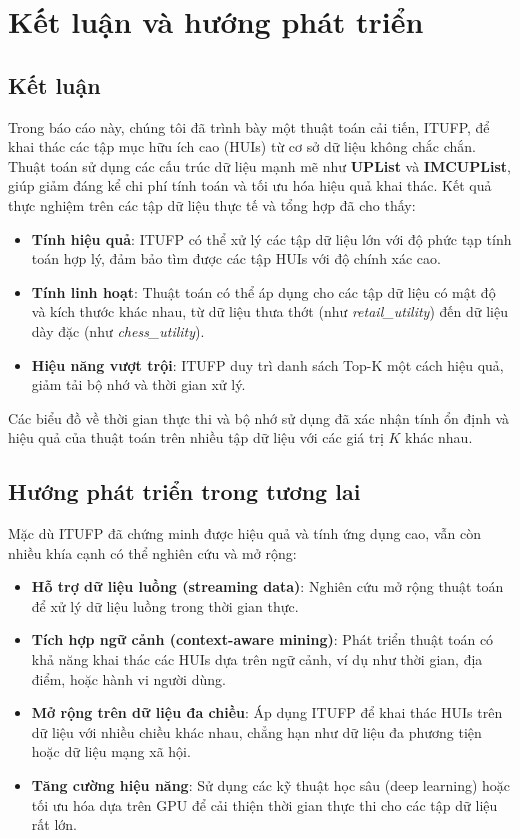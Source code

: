 \documentclass[conference]{IEEEtran}
\begin{document}
\section{Kết luận và hướng phát triển}
\label{sec:conclusion}

\subsection{Kết luận}
Trong báo cáo này, chúng tôi đã trình bày một thuật toán cải tiến, ITUFP, để khai thác các tập mục hữu ích cao (HUIs) từ cơ sở dữ liệu không chắc chắn. Thuật toán sử dụng các cấu trúc dữ liệu mạnh mẽ như \textbf{UPList} và \textbf{IMCUPList}, giúp giảm đáng kể chi phí tính toán và tối ưu hóa hiệu quả khai thác. Kết quả thực nghiệm trên các tập dữ liệu thực tế và tổng hợp đã cho thấy:

\begin{itemize}
    \item \textbf{Tính hiệu quả}: ITUFP có thể xử lý các tập dữ liệu lớn với độ phức tạp tính toán hợp lý, đảm bảo tìm được các tập HUIs với độ chính xác cao.
    \item \textbf{Tính linh hoạt}: Thuật toán có thể áp dụng cho các tập dữ liệu có mật độ và kích thước khác nhau, từ dữ liệu thưa thớt (như \textit{retail\_utility}) đến dữ liệu dày đặc (như \textit{chess\_utility}).
    \item \textbf{Hiệu năng vượt trội}: ITUFP duy trì danh sách Top-K một cách hiệu quả, giảm tải bộ nhớ và thời gian xử lý.
\end{itemize}

Các biểu đồ về thời gian thực thi và bộ nhớ sử dụng đã xác nhận tính ổn định và hiệu quả của thuật toán trên nhiều tập dữ liệu với các giá trị \(K\) khác nhau.

\subsection{Hướng phát triển trong tương lai}
Mặc dù ITUFP đã chứng minh được hiệu quả và tính ứng dụng cao, vẫn còn nhiều khía cạnh có thể nghiên cứu và mở rộng:

\begin{itemize}
    \item \textbf{Hỗ trợ dữ liệu luồng (streaming data)}: Nghiên cứu mở rộng thuật toán để xử lý dữ liệu luồng trong thời gian thực.
    \item \textbf{Tích hợp ngữ cảnh (context-aware mining)}: Phát triển thuật toán có khả năng khai thác các HUIs dựa trên ngữ cảnh, ví dụ như thời gian, địa điểm, hoặc hành vi người dùng.
    \item \textbf{Mở rộng trên dữ liệu đa chiều}: Áp dụng ITUFP để khai thác HUIs trên dữ liệu với nhiều chiều khác nhau, chẳng hạn như dữ liệu đa phương tiện hoặc dữ liệu mạng xã hội.
    \item \textbf{Tăng cường hiệu năng}: Sử dụng các kỹ thuật học sâu (deep learning) hoặc tối ưu hóa dựa trên GPU để cải thiện thời gian thực thi cho các tập dữ liệu rất lớn.
\end{itemize}
\end{document}
